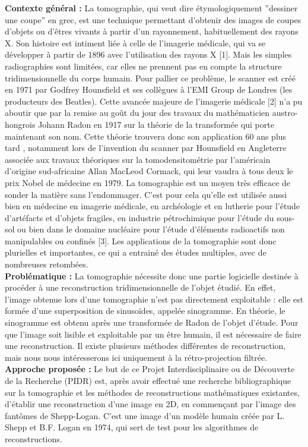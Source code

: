 \documentclass[conference]{IEEEtran}
\begin{document}
\textbf{Contexte général :}
La tomographie, qui veut dire étymologiquement ”dessiner une coupe” en grec, est une technique permettant d’obtenir des images de coupes d’objets ou d’êtres vivants à partir d'un rayonnement, habituellement des rayons X. Son histoire est intiment liée à celle de l’imagerie médicale, qui va se développer à partir de 1896 avec l’utilisation des rayons X [1]. Mais les simples radiographies sont limitées, car elles ne prennent pas en compte la structure tridimensionnelle du corps humain. Pour pallier ce problème, le scanner est créé en 1971 par Godfrey Hounsfield et ses collègues à l’EMI Group de Londres (les producteurs des Beatles). Cette avancée majeure de l’imagerie médicale [2] n’a pu aboutir que par la remise au goût du jour des travaux du mathématicien austro-hongrois Johann Radon en 1917 sur la théorie de la transformée qui porte maintenant son nom. Cette théorie trouvera donc son application 60 ans plus tard , notamment lors de l'invention du scanner par Hounsfield en Angleterre associée aux travaux théoriques sur la tomodensitométrie par l’américain d’origine sud-africaine Allan MacLeod Cormack, qui leur vaudra à tous deux le prix Nobel de médecine en 1979.
La tomographie est un moyen très efficace de sonder la matière sans l’endommager. C’est pour cela qu’elle est utilisée aussi bien en médecine en imagerie médicale, en archéologie et en lutherie pour l’étude d’artéfacts et d’objets fragiles, en industrie pétrochimique pour l’étude du sous-sol ou bien dans le domaine nucléaire pour l’étude d’éléments radioactifs non manipulables ou confinés [3]. Les applications de la tomographie sont donc plurielles et importantes, ce qui a entrainé des études multiples, avec de nombreuses retombées.
\\
\textbf{Problématique :}
La tomographie nécessite donc une partie logicielle destinée à procéder à une reconstruction tridimensionnelle de l’objet étudié. En effet, l’image obtenue lors d’une tomographie n’est pas directement exploitable : elle est formée d’une superposition de sinusoïdes, appelée sinogramme. En théorie, le sinogramme est obtenu après une transformée de Radon de l’objet d’étude. Pour que l’image soit lisible et exploitable par un être humain, il est nécessaire de faire une reconstruction. Il existe plusieurs méthodes différentes de reconstruction, mais nous nous intéresserons ici uniquement à la rétro-projection filtrée.
\\
\textbf{Approche proposée :}
Le but de ce Projet Interdisciplinaire ou de Découverte de la Recherche (PIDR) est, après avoir effectué une recherche bibliographique sur la tomographie et les méthodes de reconstructions mathématiques existantes,  d’établir une reconstruction d’une image en 2D, en commençant par l’image des fantômes de Shepp-Logan. C’est une image d’un modèle humain créée par L. Shepp et B.F. Logan en 1974, qui sert de test pour les algorithmes de reconstructions.
\end{document}
